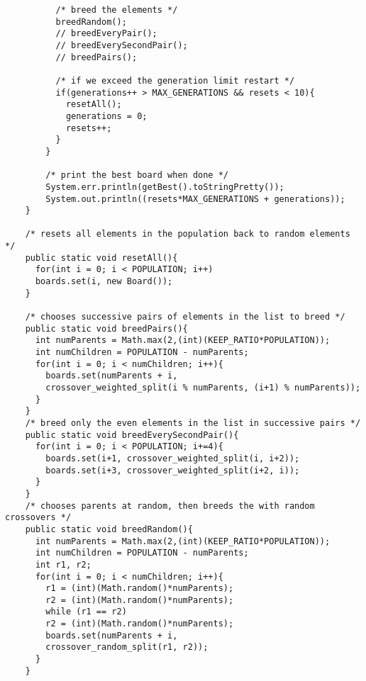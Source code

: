 \documentclass[a4paper,11pt]{article}
\begin{document}
\begin{lstlisting}
          /* breed the elements */
          breedRandom();
          // breedEveryPair();
          // breedEverySecondPair();
          // breedPairs();

          /* if we exceed the generation limit restart */
          if(generations++ > MAX_GENERATIONS && resets < 10){ 
            resetAll();
            generations = 0;
            resets++;
          }
        }

        /* print the best board when done */
        System.err.println(getBest().toStringPretty());
        System.out.println((resets*MAX_GENERATIONS + generations));
    }

    /* resets all elements in the population back to random elements */
    public static void resetAll(){
      for(int i = 0; i < POPULATION; i++)
      boards.set(i, new Board());
    }

    /* chooses successive pairs of elements in the list to breed */
    public static void breedPairs(){
      int numParents = Math.max(2,(int)(KEEP_RATIO*POPULATION));
      int numChildren = POPULATION - numParents;
      for(int i = 0; i < numChildren; i++){
        boards.set(numParents + i,
        crossover_weighted_split(i % numParents, (i+1) % numParents));
      }
    }
    /* breed only the even elements in the list in successive pairs */
    public static void breedEverySecondPair(){
      for(int i = 0; i < POPULATION; i+=4){
        boards.set(i+1, crossover_weighted_split(i, i+2));
        boards.set(i+3, crossover_weighted_split(i+2, i));
      }
    }
    /* chooses parents at random, then breeds the with random crossovers */
    public static void breedRandom(){
      int numParents = Math.max(2,(int)(KEEP_RATIO*POPULATION));
      int numChildren = POPULATION - numParents;
      int r1, r2;
      for(int i = 0; i < numChildren; i++){
        r1 = (int)(Math.random()*numParents);
        r2 = (int)(Math.random()*numParents);
        while (r1 == r2)
        r2 = (int)(Math.random()*numParents);
        boards.set(numParents + i,
        crossover_random_split(r1, r2));
      }
    }


\end{lstlisting}
\end{document}
